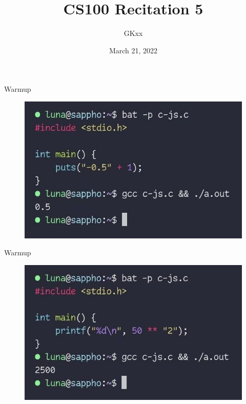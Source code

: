\documentclass{beamer}
\title{CS100 Recitation 5}
\author{GKxx}
\date{March 21, 2022}
\begin{document}
\begin{frame}
    \maketitle
\end{frame}

\begin{frame}{Warmup}
    \begin{figure}[h]
        \centering
        \includegraphics[width=\textwidth]{img/warmup_1.jpg}
    \end{figure}
\end{frame}

\begin{frame}{Warmup}
    \begin{figure}[h]
        \centering
        \includegraphics[width=\textwidth]{img/warmup_2.jpg}
    \end{figure}
\end{frame}
\end{document}
